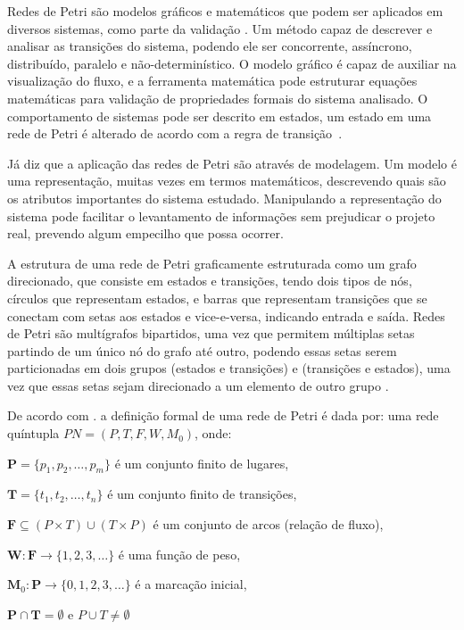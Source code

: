 Redes de Petri são modelos gráficos e matemáticos que podem ser aplicados em diversos sistemas, como parte da validação . Um método capaz de descrever e analisar as transições do sistema, podendo ele ser concorrente, assíncrono, distribuído, paralelo e não-determinístico. O modelo gráfico é capaz de auxiliar na visualização do fluxo, e a ferramenta matemática pode estruturar equações matemáticas para validação de propriedades formais do sistema analisado. O comportamento de sistemas pode ser descrito em estados, um estado em uma rede de Petri é alterado de acordo com a regra de transição~\cite{murata:1989}.

Já  diz que a aplicação das redes de Petri são através de modelagem. Um modelo é uma representação, muitas vezes em termos matemáticos, descrevendo quais são os atributos importantes do sistema estudado. Manipulando a representação do sistema pode facilitar o levantamento de informações sem prejudicar o projeto real, prevendo algum empecilho que possa ocorrer.  

A estrutura de uma rede de Petri graficamente estruturada como um grafo direcionado, que consiste em estados e transições, tendo dois tipos de nós, círculos que representam estados, e barras que representam transições que se conectam com setas aos estados e vice-e-versa, indicando entrada e saída. Redes de Petri são multígrafos bipartidos, uma vez que permitem múltiplas setas partindo de um único nó do grafo até outro, podendo essas setas serem particionadas em dois grupos (estados e transições) e (transições e estados), uma vez que essas setas sejam direcionado a um elemento de outro grupo \cite{peterson:1981}. 

De acordo com . a definição formal de uma rede de Petri é dada por:
uma rede quíntupla  \(PN = (P, T, F, W, M_0)\), onde:

\begin{description}
    \centering
    \item[] \(\textbf{P} = \{p_1, p_2, \ldots , p_m\}\) é um conjunto finito de lugares,
    \item[] \(\textbf{T} = \{t_1, t_2, \ldots, t_n\}\) é um conjunto finito de transições,
    \item[] \(\textbf{F} \subseteq (P \times T) \cup (T \times P)\) é um conjunto de arcos (relação de fluxo),
    \item[] \(\textbf{W}: \textbf{F} \to \{1,2,3,\ldots\}\) é uma função de peso,
    \item[] \(\textbf{M}_0: \textbf{P} \to \{0,1,2,3,\ldots\}\) é a marcação inicial,
    \item[] \(\textbf{P} \cap \textbf{T} = \emptyset\) e \(P \cup T \neq \emptyset\)

\end{description}
   

